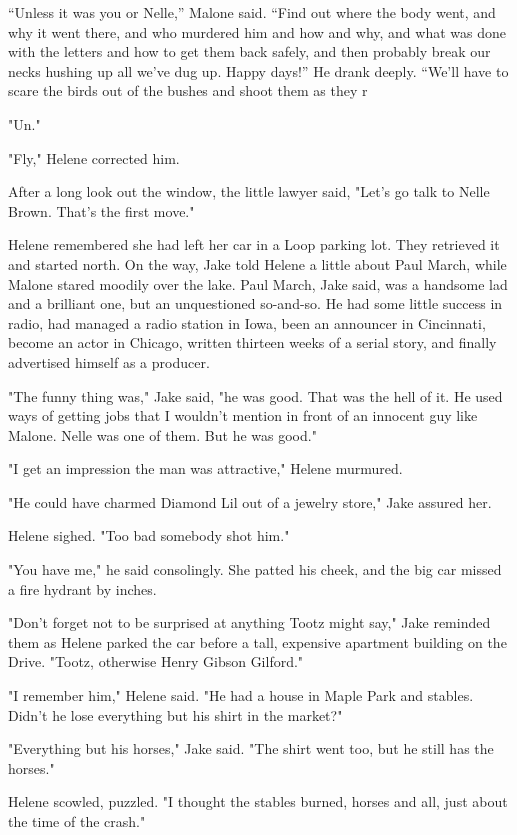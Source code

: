 \documentclass{novel}
\begin{document}
“Unless it was you or Nelle,” Malone said. “Find out where the body went, and why it went there, and who murdered him and how and why, and what was done with the letters and how to get them back safely, and then probably break our necks hushing up all we’ve dug up. Happy days!” He drank deeply. “We’ll have to scare the birds out of the bushes and shoot them as they r

"Un."

"Fly," Helene corrected him.

After a long look out the window, the little lawyer said, "Let’s go talk to Nelle Brown. That’s the first move."

Helene remembered she had left her car in a Loop parking lot. They retrieved it and started north. On the way, Jake told Helene a little about Paul March, while Malone stared moodily over the lake. Paul March, Jake said, was a handsome lad and a brilliant one, but an unquestioned so-and-so. He had some little success in radio, had managed a radio station in Iowa, been an announcer in Cincinnati, become an actor in Chicago, written thirteen weeks of a serial story, and finally advertised himself as a producer.

"The funny thing was," Jake said, "he was good. That was the hell of it. He used ways of getting jobs that I wouldn’t mention in front of an innocent guy like Malone. Nelle was one of them. But he was good."

"I get an impression the man was attractive," Helene murmured.

"He could have charmed Diamond Lil out of a jewelry store," Jake assured her.

Helene sighed. "Too bad somebody shot him."

"You have me," he said consolingly. She patted his cheek, and the big car missed a fire hydrant by inches.

"Don’t forget not to be surprised at anything Tootz might say," Jake reminded them as Helene parked the car before a tall, expensive apartment building on the Drive. "Tootz, otherwise Henry Gibson Gilford."

"I remember him," Helene said. "He had a house in Maple Park and stables. Didn’t he lose everything but his shirt in the market?"

"Everything but his horses," Jake said. "The shirt went too, but he still has the horses."

Helene scowled, puzzled. "I thought the stables burned, horses and all, just about the time of the crash."
\end{document}
